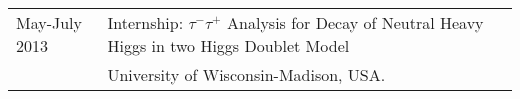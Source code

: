 \begin{table}[!ht]
\begin{tabular}{R{3 cm} m{14.6cm}}
{May-July 2013} & {\color{blue} Internship:  $ \tau^{-} \tau^{+} $ Analysis for Decay of Neutral Heavy Higgs in two Higgs Doublet Model} \footnotemark[1] \\
& University of Wisconsin-Madison, USA. \\
\end{tabular}
\end{table}
\vspace{-0.4cm}
